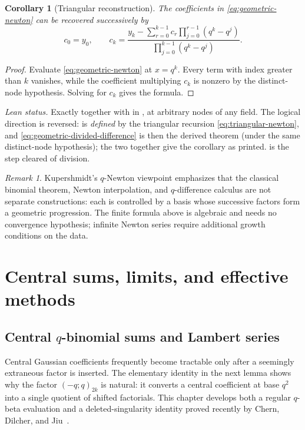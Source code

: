\documentclass[11pt,a4paper,oneside,openany]{book}
\newtheorem{corollary}[corollary]{Corollary}
\theoremstyle{definition}
\theoremstyle{remark}
\newtheorem{remark}[remark]{Remark}
\begin{document}
\begin{corollary}[Triangular reconstruction]\label{cor:geometric-triangular}
The coefficients in \eqref{eq:geometric-newton} can be recovered successively by
\[
 c_0=y_0,
 \qquad
 c_k=\frac{y_k-\sum_{r=0}^{k-1}c_r\prod_{j=0}^{r-1}(q^k-q^j)}
 {\prod_{j=0}^{k-1}(q^k-q^j)}.
 \label{eq:triangular-newton}
\]
\end{corollary}

\begin{proof}
Evaluate \eqref{eq:geometric-newton} at $x=q^k$.  Every term with index greater than $k$ vanishes, while the coefficient multiplying $c_k$ is nonzero by the distinct-node hypothesis.  Solving for $c_k$ gives the formula.
\end{proof}
\emph{Lean status.}  Exactly  together with
 in , at arbitrary nodes of any
field.  The logical direction is reversed:  is \emph{defined} by the
triangular recursion \eqref{eq:triangular-newton}, and
\eqref{eq:geometric-divided-difference} is then the derived theorem
 (under the same distinct-node hypothesis); the two together give
the corollary as printed.   is the step cleared of division.


\begin{remark}
Kupershmidt's $q$-Newton viewpoint emphasizes that the classical binomial theorem, Newton interpolation, and $q$-difference calculus are not separate constructions: each is controlled by a basis whose successive factors form a geometric progression.  The finite formula above is algebraic and needs no convergence hypothesis; infinite Newton series require additional growth conditions on the data.
\end{remark}

\part{Central sums, limits, and effective methods}

\chapter{Central \texorpdfstring{$q$}{q}-binomial sums and Lambert series}\label{chap:central}

Central Gaussian coefficients frequently become tractable only after a seemingly extraneous factor is inserted.  The elementary identity in the next lemma shows why the factor $(-q;q)_{2k}$ is natural: it converts a central coefficient at base $q^2$ into a single quotient of shifted factorials.  This chapter develops both a regular $q$-beta evaluation and a deleted-singularity identity proved recently by Chern, Dilcher, and Jiu~\cite{ChernDilcherJiu2026}.
\end{document}
